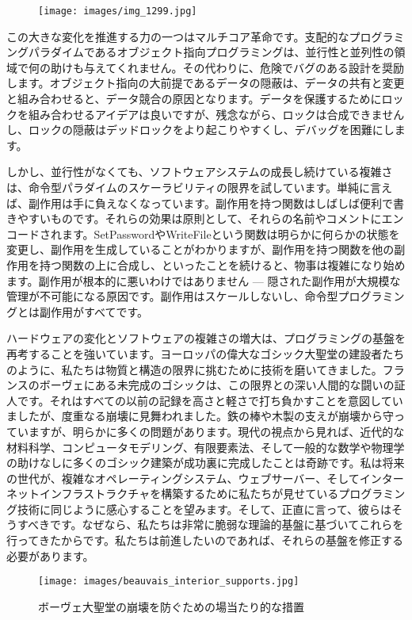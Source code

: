 \begin{figure}[H]
  \centering
  \texttt{[image: images/img\_1299.jpg]}
\end{figure}

\noindent
この大きな変化を推進する力の一つはマルチコア革命です。支配的なプログラミングパラダイムであるオブジェクト指向プログラミングは、並行性と並列性の領域で何の助けも与えてくれません。その代わりに、危険でバグのある設計を奨励します。オブジェクト指向の大前提であるデータの隠蔽は、データの共有と変更と組み合わせると、データ競合の原因となります。データを保護するためにロックを組み合わせるアイデアは良いですが、残念ながら、ロックは合成できませんし、ロックの隠蔽はデッドロックをより起こりやすくし、デバッグを困難にします。

しかし、並行性がなくても、ソフトウェアシステムの成長し続けている複雑さは、命令型パラダイムのスケーラビリティの限界を試しています。単純に言えば、副作用は手に負えなくなっています。副作用を持つ関数はしばしば便利で書きやすいものです。それらの効果は原則として、それらの名前やコメントにエンコードされます。SetPasswordやWriteFileという関数は明らかに何らかの状態を変更し、副作用を生成していることがわかりますが、副作用を持つ関数を他の副作用を持つ関数の上に合成し、といったことを続けると、物事は複雑になり始めます。副作用が根本的に悪いわけではありません --- 隠された副作用が大規模な管理が不可能になる原因です。副作用はスケールしないし、命令型プログラミングとは副作用がすべてです。

ハードウェアの変化とソフトウェアの複雑さの増大は、プログラミングの基盤を再考することを強いています。ヨーロッパの偉大なゴシック大聖堂の建設者たちのように、私たちは物質と構造の限界に挑むために技術を磨いてきました。フランスのボーヴェにある未完成のゴシックは、この限界との深い人間的な闘いの証人です。それはすべての以前の記録を高さと軽さで打ち負かすことを意図していましたが、度重なる崩壊に見舞われました。鉄の棒や木製の支えが崩壊から守っていますが、明らかに多くの問題があります。現代の視点から見れば、近代的な材料科学、コンピュータモデリング、有限要素法、そして一般的な数学や物理学の助けなしに多くのゴシック建築が成功裏に完成したことは奇跡です。私は将来の世代が、複雑なオペレーティングシステム、ウェブサーバー、そしてインターネットインフラストラクチャを構築するために私たちが見せているプログラミング技術に同じように感心することを望みます。そして、正直に言って、彼らはそうすべきです。なぜなら、私たちは非常に脆弱な理論的基盤に基づいてこれらを行ってきたからです。私たちは前進したいのであれば、それらの基盤を修正する必要があります。

\begin{figure}
  \centering
  \texttt{[image: images/beauvais\_interior\_supports.jpg]}
  \caption{ボーヴェ大聖堂の崩壊を防ぐための場当たり的な措置}
\end{figure}
